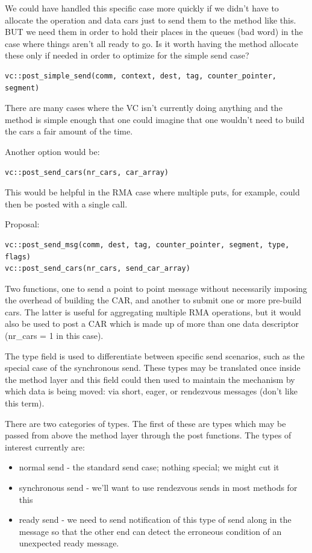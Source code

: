 \documentclass[11pt,letterpaper]{article}
\begin{document}
We could have handled this specific case more quickly if we didn't have to allocate the operation and data cars just to send them to the method like this.  BUT we need them in order to hold their places in the queues (bad word) in the case where things aren't all ready to go.  Is it worth having the method allocate these only if needed in order to optimize for the simple send case?

\begin{verbatim}
vc::post_simple_send(comm, context, dest, tag, counter_pointer, segment)
\end{verbatim}
There are many cases where the VC isn't currently doing anything and the method
is simple enough that one could imagine that one wouldn't need to build the
cars a fair amount of the time.

Another option would be:
\begin{verbatim}
vc::post_send_cars(nr_cars, car_array)
\end{verbatim}
This would be helpful in the RMA case where multiple puts, for example, could
then be posted with a single call.

Proposal:
\begin{verbatim}
vc::post_send_msg(comm, dest, tag, counter_pointer, segment, type, flags)
vc::post_send_cars(nr_cars, send_car_array)
\end{verbatim}
Two functions, one to send a point to point message without necessarily
imposing the overhead of building the CAR, and another to submit one or more
pre-build cars.  The latter is useful for aggregating multiple RMA operations,
but it would also be used to post a CAR which is made up of more than one data
descriptor (nr\_cars = 1 in this case).

The type field is used to differentiate between specific send scenarios, such
as the special case of the synchronous send.  These types may be translated
once inside the method layer and this field could then used to maintain the
mechanism by which data is being moved: via short, eager, or rendezvous
messages (don't like this term).

There are two categories of types.  The first of these are types which may be
passed from above the method layer through the post functions.  The types of
interest currently are:
\begin{itemize}
\item normal send - the standard send case; nothing special; we might cut it
\item synchronous send - we'll want to use rendezvous sends in most methods for
  this
\item ready send - we need to send notification of this type of send along in
  the message so that the other end can detect the erroneous condition of an
  unexpected ready message.
\end{itemize}
\end{document}
